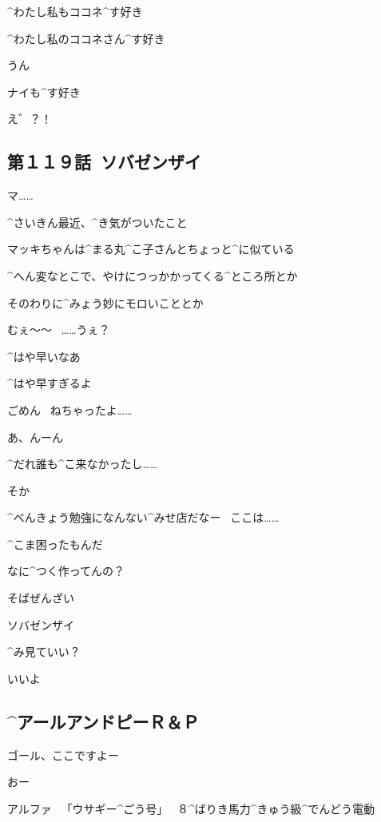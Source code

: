 \Alpha ^{わたし}{私}もココネ^{す}{好}き

\page[115]
\Maruko ^{わたし}{私}のココネさん^{す}{好}き

\Alpha うん

\page[116]
\Maruko ナイも^{す}{好}き

\Alpha え゛？！


\subsection{第１１９話\ ソバゼンザイ}

\page[119]
\Alpha マ……

\page[121]
\Alpha ^{さいきん}{最近}、^{き}{気}がついたこと

\page[122]
\Alpha マッキちゃんは^{まる}{丸}^{こ}{子}さんとちょっと^{に}{似}ている

\Alpha ^{へん}{変}なとこで、やけにつっかかってくる^{ところ}{所}とか

\Alpha そのわりに^{みょう}{妙}にモロいこととか

\page[123]
\Makki むぇ〜〜
\ ……うぇ？

\page[128]
\Alpha ^{はや}{早}いなあ

\page[129]
\Alpha ^{はや}{早}すぎるよ

\page[130]
\Makki ごめん
\ ねちゃったよ……

\Alpha あ、んーん

\Alpha ^{だれ}{誰}も^{こ}{来}なかったし……

\page[131]
\Makki そか

\Makki ^{べんきょう}{勉強}になんない^{みせ}{店}だなー
\ ここは……

\Alpha ^{こま}{困}ったもんだ

\Makki なに^{つく}{作}ってんの？

\Alpha そばぜんざい

\page[132]
\Makki ソバゼンザイ

\Makki ^{み}{見}ていい？

\Alpha いいよ


\subsection{^{アールアンドピー}{Ｒ＆Ｐ}}

\page[133]
\Kokone ゴール、ここですよー

\Alpha おー

\Sign アルファ
\ 「ウサギー^{ごう}{号}」
\ ８^{ばりき}{馬力}^{きゅう}{級}^{でんどう}{電動}

